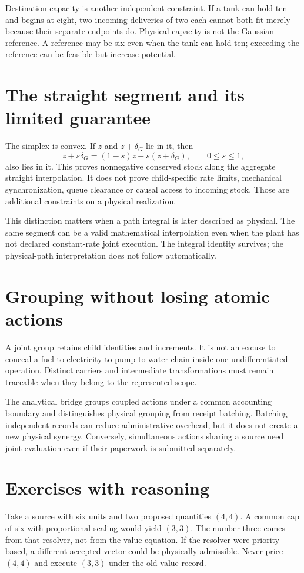 Destination capacity is another independent constraint. If a tank can hold
ten and begins at eight, two incoming deliveries of two each cannot both
fit merely because their separate endpoints do. Physical capacity is not
the Gaussian reference. A reference may be six even when the tank can hold
ten; exceeding the reference can be feasible but increase potential.

\section{The straight segment and its limited guarantee}
The simplex is convex. If $z$ and $z+\delta_G$ lie in it, then
\begin{equation}
 z+s\delta_G=(1-s)z+s(z+\delta_G),\qquad 0\leq s\leq1,
\end{equation}
also lies in it. This proves nonnegative conserved stock along the aggregate
straight interpolation. It does not prove child-specific rate limits,
mechanical synchronization, queue clearance or causal access to incoming
stock. Those are additional constraints on a physical realization.

This distinction matters when a path integral is later described as physical.
The same segment can be a valid mathematical interpolation even when the
plant has not declared constant-rate joint execution. The integral identity
survives; the physical-path interpretation does not follow automatically.

\section{Grouping without losing atomic actions}
A joint group retains child identities and increments. It is not an excuse
to conceal a fuel-to-electricity-to-pump-to-water chain inside one undifferentiated
operation. Distinct carriers and intermediate transformations must remain
traceable when they belong to the represented scope.

The analytical bridge \cite{bridge} groups coupled actions under a common
accounting boundary and distinguishes physical grouping from receipt batching.
Batching independent records can reduce administrative overhead, but it does
not create a new physical synergy. Conversely, simultaneous actions sharing
a source need joint evaluation even if their paperwork is submitted separately.

\section*{Exercises with reasoning}
Take a source with six units and two proposed quantities $(4,4)$. A common
cap of six with proportional scaling would yield $(3,3)$. The number three
comes from that resolver, not from the value equation. If the resolver were
priority-based, a different accepted vector could be physically admissible.
Never price $(4,4)$ and execute $(3,3)$ under the old value record.

